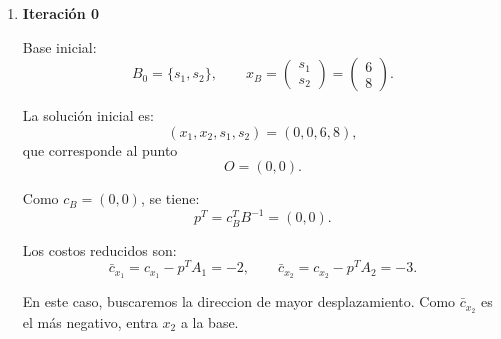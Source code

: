 \begin{enumerate}
Por lo tanto, las soluciones básicas factibles son:
\begin{equation}
(0,0,6,8),\qquad
(0,3,0,5),\qquad
(4,0,2,0),\qquad
\left(\frac{10}{3},\frac{4}{3},0,0\right).
\end{equation}

Evaluando la función objetivo original:
\begin{equation}
\begin{array}{c|c}
(x_1,x_2) & z=2x_1+3x_2\\
\hline
(0,0) & 0\\
(0,3) & 9\\
(4,0) & 8\\
\left(\frac{10}{3},\frac{4}{3}\right) & \frac{32}{3}
\end{array}
\end{equation}

Luego, la solución óptima es:
\begin{equation}
x^*=\left(\frac{10}{3},\frac{4}{3}\right),
\qquad
z^*=\frac{32}{3}.
\end{equation}

\item
\textbf{Iteración 0}

Base inicial:
\begin{equation}
B_0=\{s_1,s_2\},
\qquad
x_B=
\begin{pmatrix}
s_1\\
s_2
\end{pmatrix}
=
\begin{pmatrix}
6\\
8
\end{pmatrix}.
\end{equation}

La solución inicial es:
\begin{equation}
(x_1,x_2,s_1,s_2)=(0,0,6,8),
\end{equation}
que corresponde al punto
\begin{equation}
O=(0,0).
\end{equation}

Como $c_B=(0,0)$, se tiene:
\begin{equation}
p^T=c_B^T B^{-1}=(0,0).
\end{equation}

Los costos reducidos son:
\begin{equation}
\bar{c}_{x_1}=c_{x_1}-p^TA_1=-2,
\qquad
\bar{c}_{x_2}=c_{x_2}-p^TA_2=-3.
\end{equation}

 En este caso, buscaremos la direccion de mayor desplazamiento. Como $\bar{c}_{x_2}$ es el más negativo, entra $x_2$ a la base.


\end{enumerate}
